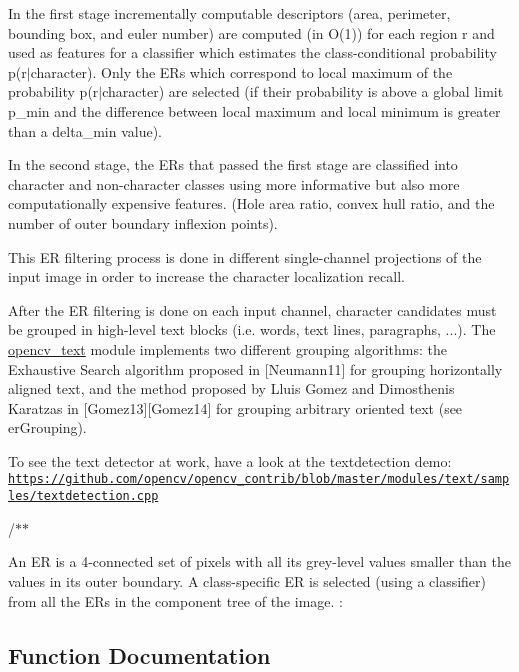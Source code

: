 In the first stage incrementally computable descriptors (area, perimeter, bounding box, and euler number) are computed (in O(1)) for each region r and used as features for a classifier which estimates the class-\/conditional probability p(r$\vert$character). Only the E\+Rs which correspond to local maximum of the probability p(r$\vert$character) are selected (if their probability is above a global limit p\+\_\+min and the difference between local maximum and local minimum is greater than a delta\+\_\+min value). 

In the second stage, the E\+Rs that passed the first stage are classified into character and non-\/character classes using more informative but also more computationally expensive features. (Hole area ratio, convex hull ratio, and the number of outer boundary inflexion points). 

This ER filtering process is done in different single-\/channel projections of the input image in order to increase the character localization recall. 

After the ER filtering is done on each input channel, character candidates must be grouped in high-\/level text blocks (i.\+e. words, text lines, paragraphs, ...). The \hyperlink{classorg_1_1bytedeco_1_1javacpp_1_1opencv__text}{opencv\+\_\+text} module implements two different grouping algorithms\+: the Exhaustive Search algorithm proposed in \mbox{[}Neumann11\mbox{]} for grouping horizontally aligned text, and the method proposed by Lluis Gomez and Dimosthenis Karatzas in \mbox{[}Gomez13\mbox{]}\mbox{[}Gomez14\mbox{]} for grouping arbitrary oriented text (see er\+Grouping). 

To see the text detector at work, have a look at the textdetection demo\+: \href{https://github.com/opencv/opencv_contrib/blob/master/modules/text/samples/textdetection.cpp}{\tt https\+://github.\+com/opencv/opencv\+\_\+contrib/blob/master/modules/text/samples/textdetection.\+cpp} 

/$\ast$$\ast$

An ER is a 4-\/connected set of pixels with all its grey-\/level values smaller than the values in its outer boundary. A class-\/specific ER is selected (using a classifier) from all the ER\textquotesingle{}s in the component tree of the image. \+: 

\subsection{Function Documentation}
\mbox{\label{group__text__detect_ga67163615b824817020e39c2738a0b122}} 
